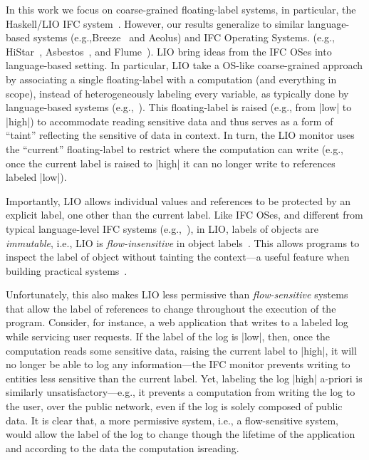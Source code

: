 In this work we focus on coarse-grained floating-label systems, in
particular, the Haskell/LIO IFC system~\cite{stefan:lio,
stefan:addressing-covert}. 
%
However, our results generalize to similar language-based systems
(e.g.,Breeze~\cite{Breeze} and Aeolus) and IFC Operating Systems.
(e.g., HiStar~\cite{zeldovich:histar},
Asbestos~\cite{Efstathopoulos:2005}, and Flume~\cite{krohn:flume}).
%
LIO bring ideas from the IFC OSes into language-based setting.
%
In particular, LIO take a OS-like coarse-grained approach by
associating a single floating-label with a computation (and everything
in scope), instead of heterogeneously labeling every variable, as
typically done by language-based systems (e.g.,~\cite{jif,FlowCaml}).
%
This floating-label is raised (e.g., from |low| to |high|) to
accommodate reading sensitive data and thus serves as a form of
``taint'' reflecting the sensitive of data in context.
%
In turn, the LIO monitor uses the ``current'' floating-label to
restrict where the computation can write (e.g., once the current label
is raised to |high| it can no longer write to references labeled
|low|).

Importantly, LIO allows individual values and references to be
protected by an explicit label, one other than the current label.
%
Like IFC OSes, and different from typical language-level IFC systems
(e.g.,~\cite{jif,FlowCaml,Hedin13}), in LIO, labels of objects are
\emph{immutable}, i.e., LIO is \emph{flow-insensitive} in object
labels~\cite{Hunt:2006}.
%
This allows programs to inspect the label of object without tainting
the context---a useful feature when building practical
systems~\cite{giffin:hails, Breeze}.

Unfortunately, this also makes LIO less permissive than
\emph{flow-sensitive} systems that allow the label of references to
change throughout the execution of the program. 
%
Consider, for instance, a web application that writes to a labeled
log while servicing user requests.
%
If the label of the log is |low|, then, once the computation reads
some sensitive data, raising the current label to |high|, it will no
longer be able to log any information---the IFC monitor prevents
writing to entities less sensitive than the current label.
%
Yet, labeling the log |high| a-priori is similarly
unsatisfactory---e.g., it prevents a computation from writing the log
to the user, over the public network, even if the log is solely
composed of public data.
%
It is clear that, a more permissive system, i.e., a flow-sensitive
system, would allow the label of the log to change though the lifetime
of the application and according to the data the computation isreading.



